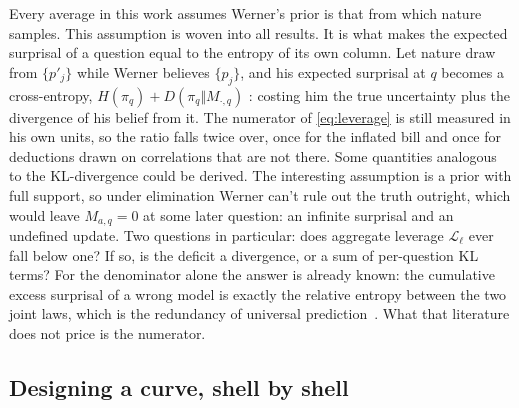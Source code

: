 \documentclass[11pt]{article}
\begin{document}
Every average in this work assumes Werner's prior is that from which nature samples.
This assumption is woven into all results. It is what makes the expected surprisal
of a question equal to the entropy of its own column. Let nature draw
from $\{p'_j\}$ while Werner believes $\{p_j\}$, and his expected surprisal at
$q$ becomes a cross-entropy, $H(\pi_q) + D(\pi_q \Vert M_{\cdot,q})$
\cite{covthomas}:
costing him the true uncertainty plus the divergence of his belief from it.
The numerator of \eqref{eq:leverage} is still measured in his own
units, so the ratio falls twice over, once for the inflated bill and
once for deductions drawn on correlations that are not there. Some quantities analogous 
to the KL-divergence could be derived.
The interesting
assumption is a prior with full support, so under elimination Werner can't rule out the truth outright, 
which would leave $M_{a,q} = 0$ at some later
question: an infinite surprisal and an undefined update. Two questions in particular: does aggregate leverage
$\mathcal L_\ell$ ever fall below one? If so, is
the deficit a divergence, or a sum of per-question KL terms? For the
denominator alone the answer is already known: the cumulative excess
surprisal of a wrong model is exactly the relative entropy between the
two joint laws, which is the redundancy of universal
prediction~\cite{merhav98}. What that literature does not price is the
numerator.

\subsection{Designing a curve, shell by shell}
\end{document}
